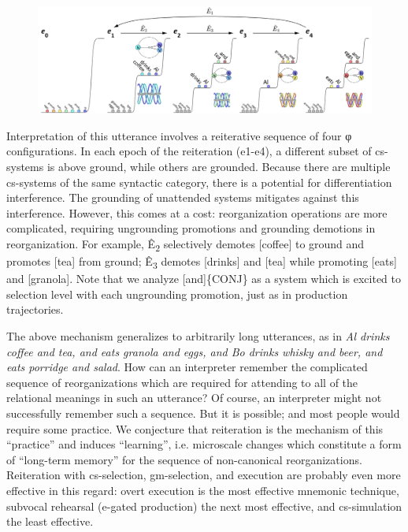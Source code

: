 \z
  
\begin{figure}
\includegraphics[width=\textwidth]{figures/Tilsen-img123.png}
\caption{\missingcaption}
\label{fig:6:4}
\end{figure}
 

  Interpretation of this utterance involves a reiterative sequence of four φ configurations. In each epoch of the reiteration (e1-e4), a different subset of cs-systems is above ground, while others are grounded. Because there are multiple cs-systems of the same syntactic category, there is a potential for differentiation interference. The grounding of unattended systems mitigates against this interference. However, this comes at a cost: reorganization operations are more complicated, requiring ungrounding promotions and grounding demotions in reorganization. For example, Ê\textsubscript{2} selectively demotes [coffee] to ground and promotes [tea] from ground; Ê\textsubscript{3} demotes [drinks] and [tea] while promoting [eats] and [granola]. Note that we analyze [and]\{CONJ\} as a system which is excited to selection level with each ungrounding promotion, just as in production trajectories.

  The above mechanism generalizes to arbitrarily long utterances, as in \textit{Al drinks coffee and tea, and eats granola and eggs, and Bo drinks whisky and beer, and eats porridge and salad}. How can an interpreter remember the complicated sequence of reorganizations which are required for attending to all of the relational meanings in such an utterance? Of course, an interpreter might not successfully remember such a sequence. But it is possible; and most people would require some practice. We conjecture that reiteration is the mechanism of this “practice” and induces “learning”, i.e. microscale changes which constitute a form of “long-term memory” for the sequence of non-canonical reorganizations. Reiteration with cs-selection, gm-selection, and execution are probably even more effective in this regard: overt execution is the most effective mnemonic technique, subvocal rehearsal (e-gated production) the next most effective, and cs-simulation the least effective.

